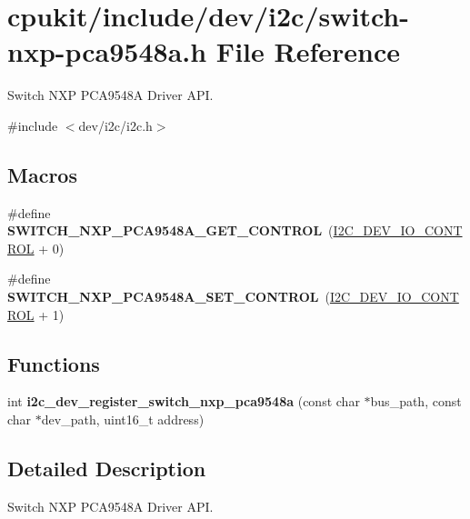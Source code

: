 \hypertarget{switch-nxp-pca9548a_8h}{}\section{cpukit/include/dev/i2c/switch-\/nxp-\/pca9548a.h File Reference}
\label{switch-nxp-pca9548a_8h}


Switch N\+XP P\+C\+A9548A Driver A\+PI.  


{\ttfamily \#include $<$dev/i2c/i2c.\+h$>$}\newline
\subsection*{Macros}
\begin{DoxyCompactItemize}
\item 
\#define {\bfseries S\+W\+I\+T\+C\+H\+\_\+\+N\+X\+P\+\_\+\+P\+C\+A9548\+A\+\_\+\+G\+E\+T\+\_\+\+C\+O\+N\+T\+R\+OL}~(\mbox{\hyperlink{group__I2CDevice_gae8b74d1b5fc16a9c31e4da115b0ab004}{I2\+C\+\_\+\+D\+E\+V\+\_\+\+I\+O\+\_\+\+C\+O\+N\+T\+R\+OL}} + 0)
\item 
\#define {\bfseries S\+W\+I\+T\+C\+H\+\_\+\+N\+X\+P\+\_\+\+P\+C\+A9548\+A\+\_\+\+S\+E\+T\+\_\+\+C\+O\+N\+T\+R\+OL}~(\mbox{\hyperlink{group__I2CDevice_gae8b74d1b5fc16a9c31e4da115b0ab004}{I2\+C\+\_\+\+D\+E\+V\+\_\+\+I\+O\+\_\+\+C\+O\+N\+T\+R\+OL}} + 1)
\end{DoxyCompactItemize}
\subsection*{Functions}
\begin{DoxyCompactItemize}
\item 
int {\bfseries i2c\+\_\+dev\+\_\+register\+\_\+switch\+\_\+nxp\+\_\+pca9548a} (const char $\ast$bus\+\_\+path, const char $\ast$dev\+\_\+path, uint16\+\_\+t address)
\end{DoxyCompactItemize}


\subsection{Detailed Description}
Switch N\+XP P\+C\+A9548A Driver A\+PI. 


